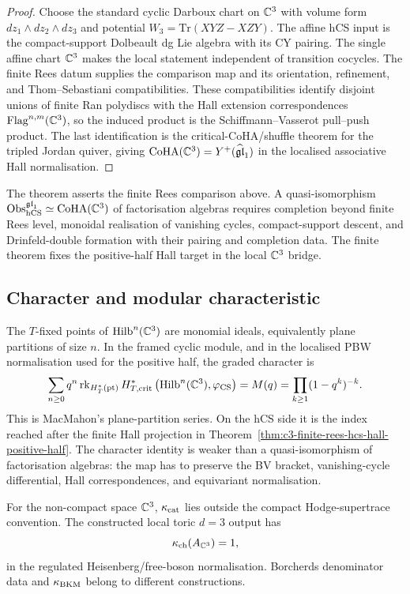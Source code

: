 \begin{proof}
Choose the standard cyclic Darboux chart on $\mathbb{C}^3$ with volume form
$dz_1\wedge dz_2\wedge dz_3$ and potential
$W_3=\mathrm{Tr}(XYZ-XZY)$. The affine hCS input is the compact-support
Dolbeault dg Lie algebra with its CY pairing. The single affine chart
\(\mathbb{C}^3\) makes the local statement independent of transition cocycles.
The finite Rees datum supplies the comparison map and its orientation,
refinement, and Thom--Sebastiani compatibilities. These compatibilities
identify disjoint unions of finite Ran polydiscs with the Hall extension
correspondences $\mathrm{Flag}^{n,m}(\mathbb{C}^3)$, so the induced product is
the Schiffmann--Vasserot pull--push product. The last identification is
the critical-CoHA/shuffle theorem for the tripled Jordan quiver, giving
$\mathrm{CoHA}(\mathbb{C}^3)=Y^{+}(\widehat{\mathfrak{gl}}_1)$ in the localised associative Hall
normalisation.
\end{proof}

The theorem asserts the finite Rees comparison above. A
quasi-isomorphism
$\mathrm{Obs}_{\mathrm{hCS}}^{\mathfrak{gl}_1}\simeq\mathrm{CoHA}(\mathbb{C}^3)$ of factorisation
algebras requires completion beyond finite Rees level, monoidal
realisation of vanishing cycles, compact-support descent, and
Drinfeld-double formation with their pairing and completion data. The
finite theorem fixes the positive-half Hall target in the local $\mathbb{C}^3$
bridge.

\subsection*{Character and modular characteristic}

The $T$-fixed points of $\mathrm{Hilb}^n(\mathbb{C}^3)$ are monomial ideals,
equivalently plane partitions of size $n$. In the framed cyclic module,
and in the localised PBW normalisation used for the positive half, the
graded character is
\[
  \sum_{n\geq 0}q^n
  \operatorname{rk}_{H^\ast_T(\mathrm{pt})}
  H^\ast_{T,\mathrm{crit}}
  \left(\mathrm{Hilb}^n(\mathbb{C}^3),\varphi_{\mathrm{CS}}\right)
  =
  M(q)
  =
  \prod_{k\geq 1}(1-q^k)^{-k}.
\]
This is MacMahon's plane-partition series. On the hCS side it is the
index reached after the finite Hall projection in
Theorem~\ref{thm:c3-finite-rees-hcs-hall-positive-half}. The character
identity is weaker than a quasi-isomorphism of factorisation algebras:
the map has to preserve the BV bracket, vanishing-cycle differential,
Hall correspondences, and equivariant normalisation.

For the non-compact space $\mathbb{C}^3$, $\kappa_{\mathrm{cat}}$ lies outside the compact
Hodge-supertrace convention. The constructed local toric $d=3$ output has
\[
  \kappa_{\mathrm{ch}}(A_{\mathbb{C}^3})=1,
\]
in the regulated Heisenberg/free-boson normalisation. Borcherds
denominator data and $\kappa_{\mathrm{BKM}}$ belong to different constructions.

